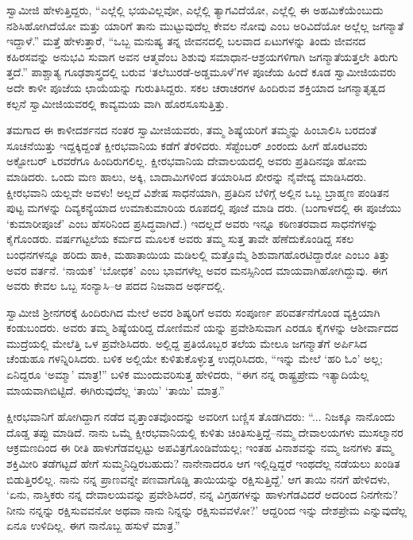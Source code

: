 ಸ್ವಾಮೀಜಿ ಹೇಳುತ್ತಿದ್ದರು, “ಎಲ್ಲೆಲ್ಲಿ ಭಯವಿಲ್ಲವೋ, ಎಲ್ಲೆಲ್ಲಿ ತ್ಯಾಗವಿದೆಯೋ, ಎಲ್ಲೆಲ್ಲಿ ಈ ಅಹಮಿಕೆಯೆಂಬುದು ನಶಿಸಿಹೋಗಿದೆಯೋ ಮತ್ತು ಯಾರಿಗೆ ತಾನು ಮುಟ್ಟುವುದೆಲ್ಲ ಕೇವಲ ನೋವು ಎಂಬ ಅರಿವಿದೆಯೋ ಅಲ್ಲೆಲ್ಲ ಜಗನ್ಮಾತೆ ಇದ್ದಾಳೆ.” ಮತ್ತೆ ಹೇಳುತ್ತಾರೆ, “ಒಬ್ಬ ಮನುಷ್ಯ ತನ್ನ ಜೀವನದಲ್ಲಿ ಬಲವಾದ ಏಟುಗಳನ್ನು ತಿಂದು ಜೀವನದ ಕಹಿರಸವನ್ನು ಅನುಭವಿ ಸುವಾಗ ಅವನ ಆತ್ಮವೆಂಬ ಶಿಶುವು ಸಮಾಧಾನ-ಆಶ್ರಯಗಳಿಗಾಗಿ ಜಗನ್ಮಾತೆಯತ್ತಲೇ ತಿರುಗು ತ್ತದೆ.” ಪಾಶ್ಚಾತ್ಯ ಗೂಢಶಾಸ್ತ್ರದಲ್ಲಿ ಬರುವ ‘ತಲೆಬುರಡೆ-ಅಡ್ಡಮೂಳೆ’ಗಳ ಪೂಜೆಯ ಹಿಂದೆ ಕೂಡ ಸ್ವಾಮೀಜಿಯವರು ಅದೇ ಕಾಳೀ ಪೂಜೆಯ ಛಾಯೆಯನ್ನು ಗುರುತಿಸಿದ್ದರು. ಸಕಲ ಚರಾಚರಗಳ ಹಿಂದಿರುವ ಶಕ್ತಿಯಾದ ಜಗನ್ಮಾತೃತ್ವದ ಕಲ್ಪನೆ ಸ್ವಾಮೀಜಿಯವರಲ್ಲಿ ಕಾವ್ಯಮಯ ವಾಗಿ ಹೊರಸೂಸುತ್ತಿತ್ತು.

ತಮಗಾದ ಈ ಕಾಳೀದರ್ಶನದ ನಂತರ ಸ್ವಾಮೀಜಿಯವರು, ತಮ್ಮ ಶಿಷ್ಯೆಯರಿಗೆ ತಮ್ಮನ್ನು ಹಿಂಬಾಲಿಸಿ ಬರದಂತೆ ಸೂಚನೆಯಿತ್ತು ಇದ್ದಕ್ಕಿದ್ದಂತೆ ಕ್ಷೀರಭವಾನಿಯ ಕಡೆಗೆ ತೆರಳಿದರು. ಸೆಪ್ಟೆಂಬರ್ ೨ಂರಂದು ಹೀಗೆ ಹೊರಟವರು ಅಕ್ಟೋಬರ್ ೬ರವರೆಗೂ ಹಿಂದಿರುಗಲಿಲ್ಲ. ಕ್ಷೀರಭವಾನಿಯ ದೇವಾಲಯದಲ್ಲಿ ಅವರು ಪ್ರತಿದಿನವೂ ಹೋಮ ಮಾಡಿದರು. ಒಂದು ಮಣ ಹಾಲು, ಅಕ್ಕಿ, ಬಾದಾಮಿಗಳಿಂದ ತಯಾರಿಸಿದ ಖೀರನ್ನು ನೈವೇದ್ಯ ಮಾಡಿಸಿದರು. ಕ್ಷೀರಭವಾನಿ ಯಲ್ಲವೇ ಅವಳು! ಅಲ್ಲದೆ ವಿಶೇಷ ಸಾಧನೆಯಾಗಿ, ಪ್ರತಿದಿನ ಬೆಳಿಗ್ಗೆ ಅಲ್ಲಿನ ಒಬ್ಬ ಬ್ರಾಹ್ಮಣ ಪಂಡಿತನ ಪುಟ್ಟ ಮಗಳನ್ನು ದಿವ್ಯಕನ್ಯೆಯಾದ ಉಮಾಕುಮಾರಿಯ ರೂಪದಲ್ಲಿ ಪೂಜೆ ಮಾಡಿ ದರು. (ಬಂಗಾಳದಲ್ಲಿ ಈ ಪೂಜೆಯು ‘ಕುಮಾರೀಪೂಜೆ’ ಎಂಬ ಹೆಸರಿನಿಂದ ಪ್ರಸಿದ್ಧವಾಗಿದೆ.) ಇದಲ್ಲದೆ ಅವರು ಇನ್ನೂ ಕಠಿಣತರವಾದ ಸಾಧನೆಗಳನ್ನು ಕೈಗೊಂಡರು. ವರ್ಷಗಟ್ಟಲೆಯ ಕರ್ಮದ ಮೂಲಕ ಅವರು ತಮ್ಮ ಸುತ್ತ ತಾವೇ ಹೆಣೆದುಕೊಂಡಿದ್ದ ಸಕಲ ಬಂಧನಗಳನ್ನೂ ಹರಿದು ಹಾಕಿ, ಮಹಾತಾಯಿಯ ಮಡಿಲಲ್ಲಿ ಮತ್ತೊಮ್ಮೆ ಶಿಶುವಾಗಹೊರಟಿದ್ದಾರೋ ಎಂಬಂ ತಿತ್ತು ಅವರ ವರ್ತನೆ. ‘ನಾಯಕ’ ‘ಬೋಧಕ’ ಎಂಬ ಭಾವಗಳೆಲ್ಲ ಅವರ ಮನಸ್ಸಿನಿಂದ ಮಾಯವಾಗಿಹೋಗಿದ್ದುವು. ಈಗ ಅವರು ಕೇವಲ ಒಬ್ಬ ಸಂನ್ಯಾಸಿ–ಆ ಪದದ ನಿಜವಾದ ಅರ್ಥದಲ್ಲಿ.

ಸ್ವಾಮೀಜಿ ಶ್ರೀನಗರಕ್ಕೆ ಹಿಂದಿರುಗಿದ ಮೇಲೆ ಅವರ ಶಿಷ್ಯರಿಗೆ ಅವರು ಸಂಪೂರ್ಣ ಪರಿವರ್ತನೆಗೊಂಡ ವ್ಯಕ್ತಿಯಾಗಿ ಕಂಡುಬಂದರು. ಅವರು ತಮ್ಮ ಶಿಷ್ಯೆಯರಿದ್ದ ದೋಣಿಮನೆ ಯನ್ನು ಪ್ರವೇಶಿಸುವಾಗ ಎರಡೂ ಕೈಗಳನ್ನು ಆಶೀರ್ವಾದದ ಮುದ್ರೆಯಲ್ಲಿ ಮೇಲೆತ್ತಿ ಒಳ ಪ್ರವೇಶಿಸಿದರು. ಅಲ್ಲಿದ್ದ ಪ್ರತಿಯೊಬ್ಬರ ತಲೆಯ ಮೇಲೂ ಜಗನ್ಮಾತೆಗೆ ಅರ್ಪಿಸಿದ ಚೆಂಡುಹೂ ಗಳನ್ನಿರಿಸಿದರು. ಬಳಿಕ ಅಲ್ಲಿಯೇ ಕುಳಿತುಕೊಳ್ಳುತ್ತ ಉದ್ಗರಿಸಿದರು, “ಇನ್ನು ಮೇಲೆ ‘ಹರಿ ಓಂ’ ಅಲ್ಲ; ಏನಿದ್ದರೂ ‘ಅಮ್ಮಾ’ ಮಾತ್ರ!” ಬಳಿಕ ಮುಂದುವರಿಸುತ್ತ ಹೇಳಿದರು, “ಈಗ ನನ್ನ ರಾಷ್ಟ್ರಪ್ರೇಮ ಇತ್ಯಾದಿಯೆಲ್ಲ ಮಾಯವಾಗಿಬಿಟ್ಟಿದೆ. ಈಗಿರುವುದೆಲ್ಲ ‘ತಾಯಿ’ ‘ತಾಯಿ’ ಮಾತ್ರ.”

ಕ್ಷೀರಭವಾನಿಗೆ ಹೋಗಿದ್ದಾಗ ನಡೆದ ವೃತ್ತಾಂತವೊಂದನ್ನು ಅವರೀಗ ಬಣ್ಣಿಸ ತೊಡಗಿದರು: “... ನಿಜಕ್ಕೂ ನಾನೊಂದು ದೊಡ್ಡ ತಪ್ಪು ಮಾಡಿದೆ. ನಾನು ಒಮ್ಮೆ ಕ್ಷೀರಭವಾನಿಯಲ್ಲಿ ಕುಳಿತು ಚಿಂತಿಸುತ್ತಿದ್ದೆ–ನಮ್ಮ ದೇವಾಲಯಗಳು ಮುಸಲ್ಮಾನರ ಆಕ್ರಮಣದಿಂದ ಈ ರೀತಿ ಹಾಳುಗೆಡವಲ್ಪಟ್ಟು ಅಪವಿತ್ರಗೊಂಡಿವೆಯಲ್ಲ; ಇಂತಹ ವಿನಾಶವನ್ನು ನಮ್ಮ ಜನಗಳು ತಮ್ಮ ಶಕ್ತಿಮೀರಿ ತಡೆಗಟ್ಟದೆ ಹೇಗೆ ಸುಮ್ಮನಿದ್ದಿರಬಹುದು? ನಾನೇನಾದರೂ ಆಗ ಇಲ್ಲಿದ್ದಿದ್ದರೆ ಇಂಥದೆಲ್ಲ ನಡೆಯಲು ಖಂಡಿತ ಬಿಡುತ್ತಿರಲಿಲ್ಲ. ನಾನು ನನ್ನ ಪ್ರಾಣವನ್ನೇ ಪಣವಾಗೊಡ್ಡಿ ತಾಯಿಯನ್ನು ರಕ್ಷಿಸುತ್ತಿದ್ದೆ.’ ಆಗ ತಾಯಿ ನನಗೆ ಹೇಳಿದಳು, ‘ಏನು, ನಾಸ್ತಿಕರು ನನ್ನ ದೇವಾಲಯವನ್ನು ಪ್ರವೇಶಿಸಿದರೆ, ನನ್ನ ವಿಗ್ರಹಗಳನ್ನು ಹಾಳುಗೆಡವಿದರೆ ಅದರಿಂದ ನಿನಗೇನು? ನೀನು ನನ್ನನ್ನು ರಕ್ಷಿಸುವವನೋ ಅಥವಾ ನಾನು ನಿನ್ನನ್ನು ರಕ್ಷಿಸುವವಳೋ?’ ಆದ್ದರಿಂದ ಇನ್ನು ದೇಶಪ್ರೇಮ ಎನ್ನುವುದೆಲ್ಲ ಏನೂ ಉಳಿದಿಲ್ಲ. ಈಗ ನಾನೊಬ್ಬ ಹಸುಳೆ ಮಾತ್ರ.”

